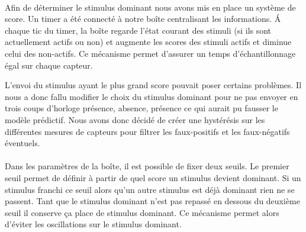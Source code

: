 \paragraph{}
Afin de déterminer le stimulus dominant nous avons mis en place un système de score. Un timer a 
été connecté à notre boîte centralisant les informations. \'A chaque tic du timer, la boîte regarde
l'état courant des stimuli (si ils sont actuellement actifs ou non) et augmente les scores des stimuli
actifs et diminue celui des non-actifs. Ce mécanisme permet d'assurer un temps d'échantillonnage égal
sur chaque capteur.

L'envoi du stimulus ayant le plus grand score pouvait poser certains problèmes. Il nous a donc 
fallu modifier le choix du stimulus dominant pour ne pas envoyer en trois coups d'horloge
présence, absence, présence ce qui aurait pu fausser le modèle prédictif. 
Nous avons donc décidé de créer une hystérésis sur les différentes mesures de
capteurs pour filtrer les faux-positifs et les faux-négatifs éventuels. 

\paragraph{}
Dans les paramètres de la boîte, il est possible de fixer deux seuils.
Le premier seuil permet de définir à partir de quel score un stimulus devient dominant.
Si un stimulus franchi ce seuil alors qu'un autre stimulus est déjà dominant rien ne se passent.
Tant que le stimulus dominant n'est pas repassé en dessous du deuxième seuil il conserve ça place de 
stimulus dominant.
Ce mécanisme permet alors d'éviter les oscillations sur le stimulus dominant.

